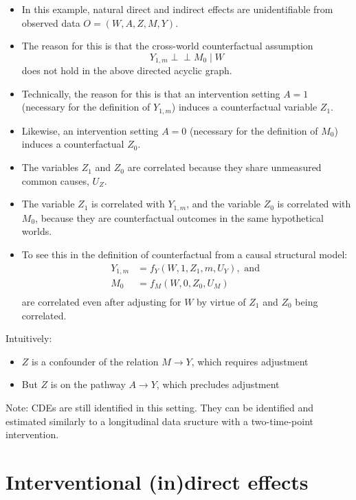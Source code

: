 \documentclass[
  12pt,
]{book}
\providecommand{\tightlist}{%
  \setlength{\itemsep}{0pt}\setlength{\parskip}{0pt}}
\theoremstyle{definition}
\theoremstyle{definition}
\theoremstyle{definition}
\newcommand{\indep}{\mbox{$\perp\!\!\!\perp$}}
\newcommand{\1}{\mathbbm{1}}
\begin{document}
\begin{itemize}
\tightlist
\item
  In this example, natural direct and indirect effects are unidentifiable from observed data \(O=(W,A,Z,M,Y)\).
\item
  The reason for this is that the cross-world counterfactual
  assumption
  \begin{equation*}
  Y_{1,m}\indep M_0\mid W
  \end{equation*}
  does not hold in the above directed acyclic graph.
\item
  Technically, the reason for this is that an intervention setting \(A=1\)
  (necessary for the definition of \(Y_{1,m}\)) induces a counterfactual variable
  \(Z_1\).
\item
  Likewise, an intervention setting \(A=0\) (necessary for the definition of
  \(M_0\)) induces a counterfactual \(Z_0\).
\item
  The variables \(Z_1\) and \(Z_0\) are correlated because they share unmeasured
  common causes, \(U_Z\).
\item
  The variable \(Z_1\) is correlated with \(Y_{1,m}\), and the variable \(Z_0\) is
  correlated with \(M_0\), because they are counterfactual outcomes in the same
  hypothetical worlds.
\item
  To see this in the definition of counterfactual from a causal structural
  model:
  \begin{align*}
  Y_{1,m} &= f_Y(W, 1, Z_1, m, U_Y), \text{ and }\\
  M_0 &= f_M(W, 0, Z_0, U_M)\\
  \end{align*}
  are correlated even after adjusting for \(W\) by virtue of \(Z_1\) and \(Z_0\) being
  correlated.
\end{itemize}

Intuitively:

\begin{itemize}
\tightlist
\item
  \(Z\) is a confounder of the relation \(M \rightarrow Y\), which requires
  adjustment
\item
  But \(Z\) is on the pathway \(A\rightarrow Y\), which precludes adjustment
\end{itemize}

Note: CDEs are still identified in this setting. They can be identified and
estimated similarly to a longitudinal data sructure with a two-time-point
intervention.

\hypertarget{interventional-indirect-effects}{%
\section{Interventional (in)direct effects}\label{interventional-indirect-effects}}
\end{document}

